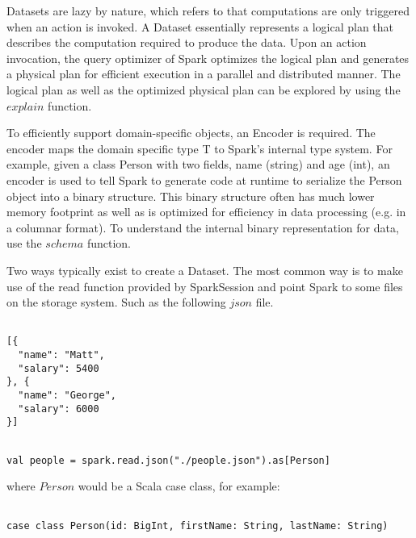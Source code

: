 \documentclass[main.tex]{thesis.tex}
\begin{document}
Datasets are lazy by nature, which refers to that computations are only triggered when an action is invoked.
A Dataset essentially represents a logical plan that describes the computation required to produce the data.
Upon an action invocation, the query optimizer of Spark optimizes the logical plan and generates a physical plan for efficient execution in a parallel and distributed manner.
The logical plan as well as the optimized physical plan can be explored by using the $explain$ function. \cite{spark-dataset}

To efficiently support domain-specific objects, an Encoder is required.
The encoder maps the domain specific type T to Spark's internal type system.
For example, given a class Person with two fields, name (string) and age (int), an encoder is used to tell Spark to generate code at runtime to serialize the Person object into a binary structure.
This binary structure often has much lower memory footprint as well as is optimized for efficiency in data processing (e.g. in a columnar format).
To understand the internal binary representation for data, use the $schema$ function. \cite{spark-dataset}

Two ways typically exist to create a Dataset.
The most common way is to make use of the read function provided by SparkSession and point Spark to some files on the storage system. Such as the following $json$ file.


\begin{lstlisting}[caption=Example JSON file]

[{
  "name": "Matt",
  "salary": 5400
}, {
  "name": "George",
  "salary": 6000
}]

\end{lstlisting}


\lstset{
	frame=0,
	language=Scala,
	breaklines=true,
}

\begin{lstlisting}[caption=Creating a new Dataset by using read function]

val people = spark.read.json("./people.json").as[Person]

\end{lstlisting}

where $Person$ would be a Scala case class, for example:

\begin{lstlisting}[caption=Definition of case class Person]

case class Person(id: BigInt, firstName: String, lastName: String)

\end{lstlisting}
\end{document}
